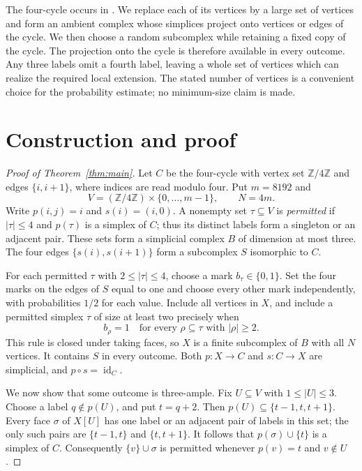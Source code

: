 \documentclass[11pt,a4paper]{article}
\begin{document}
The four-cycle occurs in \cite[Example~6]{Barmak}. We replace each of its
vertices by a large set of vertices and form an ambient complex whose
simplices project onto vertices or edges of the cycle. We then choose a
random subcomplex while retaining a fixed copy of the cycle. The projection
onto the cycle is therefore available in every outcome.
Any three labels omit a fourth label, leaving a whole set of vertices which
can realize the required local extension. The stated number of vertices is
a convenient choice for the probability estimate; no minimum-size claim is
made.

\section{Construction and proof}

\begin{proof}[Proof of Theorem~\ref{thm:main}]
Let $C$ be the four-cycle with vertex set $\mathbb{Z}/4\mathbb{Z}$ and
edges $\{i,i+1\}$, where indices are read modulo four. Put $m=8192$ and
\[
 V=(\mathbb{Z}/4\mathbb{Z})\times\{0,\ldots,m-1\},\qquad N=4m.
\]
Write $p(i,j)=i$ and $s(i)=(i,0)$. A nonempty set $\tau\subseteq V$ is
\emph{permitted} if $|\tau|\leq4$ and $p(\tau)$ is a simplex of $C$;
thus its distinct labels form a singleton or an adjacent pair. These sets
form a simplicial complex $B$ of dimension at most three. The four edges
$\{s(i),s(i+1)\}$ form a subcomplex $S$ isomorphic to $C$.

For each permitted $\tau$ with $2\leq|\tau|\leq4$, choose a mark
$b_\tau\in\{0,1\}$. Set the four marks on the edges of $S$ equal to one
and choose every other mark independently, with probabilities $1/2$ for
each value. Include all vertices in $X$, and include a permitted simplex
$\tau$ of size at least two precisely when
\begin{equation}\label{eq:marks}
 b_\rho=1\quad\text{for every }\rho\subseteq\tau\text{ with }|\rho|\geq2.
\end{equation}
This rule is closed under taking faces, so $X$ is a finite subcomplex of
$B$ with all $N$ vertices. It contains $S$ in every outcome. Both $p:X\to C$
and $s:C\to X$ are simplicial, and $p\circ s=\operatorname{id}_C$.

We now show that some outcome is three-ample. Fix $U\subseteq V$ with
$1\leq|U|\leq3$. Choose a label $q\notin p(U)$, and put $t=q+2$.
Then $p(U)\subseteq\{t-1,t,t+1\}$. Every face $\sigma$ of $X[U]$ has
one label or an adjacent pair of labels in this set; the only such pairs
are $\{t-1,t\}$ and $\{t,t+1\}$. It follows that
$p(\sigma)\cup\{t\}$ is a simplex of $C$.
Consequently $\{v\}\cup\sigma$ is permitted whenever $p(v)=t$ and
$v\notin U$.


\end{proof}
\end{document}
